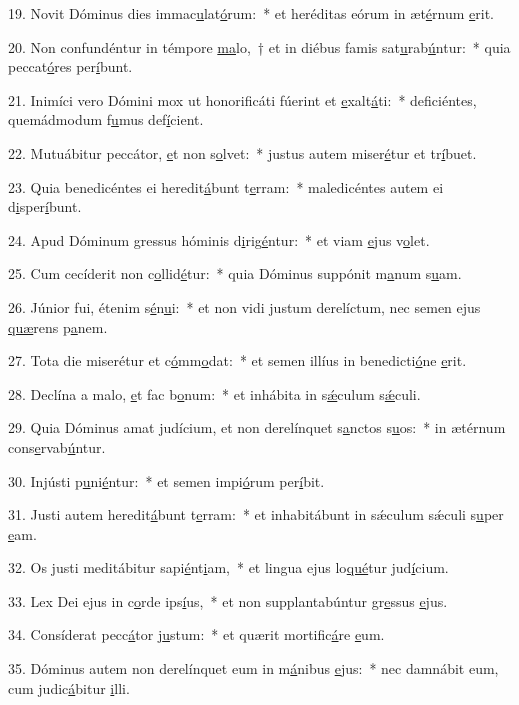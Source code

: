 19. Novit Dóminus dies immac\uline{u}lat\uline{ó}rum:~* et heréditas eórum in æt\uline{é}rnum \uline{e}rit.\par 
20. Non confundéntur in témpore \uline{ma}lo,~† et in diébus famis sat\uline{u}rab\uline{ú}ntur:~* quia peccat\uline{ó}res per\uline{í}bunt.\par 
21. Inimíci vero Dómini mox ut honorificáti fúerint et \uline{e}xalt\uline{á}ti:~* deficiéntes, quemádmodum f\uline{u}mus def\uline{í}cient.\par 
22. Mutuábitur peccátor, \uline{e}t non s\uline{o}lvet:~* justus autem miser\uline{é}tur et tr\uline{í}buet.\par 
23. Quia benedicéntes ei heredit\uline{á}bunt t\uline{e}rram:~* maledicéntes autem ei d\uline{i}sper\uline{í}bunt.\par 
24. Apud Dóminum gressus hóminis d\uline{i}rig\uline{é}ntur:~* et viam \uline{e}jus v\uline{o}let.\par 
25. Cum cecíderit non c\uline{o}llid\uline{é}tur:~* quia Dóminus suppónit m\uline{a}num s\uline{u}am.\par 
26. Júnior fui, étenim s\uline{é}n\uline{u}i:~* et non vidi justum derelíctum, nec semen ejus \uline{quæ}rens p\uline{a}nem.\par 
27. Tota die miserétur et c\uline{ó}mm\uline{o}dat:~* et semen illíus in benedicti\uline{ó}ne \uline{e}rit.\par 
28. Declína a malo, \uline{e}t fac b\uline{o}num:~* et inhábita in s\uline{ǽ}culum s\uline{ǽ}culi.\par 
29. Quia Dóminus amat judícium, et non derelínquet s\uline{a}nctos s\uline{u}os:~* in ætérnum cons\uline{e}rvab\uline{ú}ntur.\par 
30. Injústi p\uline{u}ni\uline{é}ntur:~* et semen impi\uline{ó}rum per\uline{í}bit.\par 
31. Justi autem heredit\uline{á}bunt t\uline{e}rram:~* et inhabitábunt in sǽculum sǽculi s\uline{u}per \uline{e}am.\par 
32. Os justi meditábitur sapi\uline{é}nt\uline{i}am,~* et lingua ejus lo\uline{qué}tur jud\uline{í}cium.\par 
33. Lex Dei ejus in c\uline{o}rde ips\uline{í}us,~* et non supplantabúntur gr\uline{e}ssus \uline{e}jus.\par 
34. Consíderat pecc\uline{á}tor j\uline{u}stum:~* et quærit mortific\uline{á}re \uline{e}um.\par 
35. Dóminus autem non derelínquet eum in m\uline{á}nibus \uline{e}jus:~* nec damnábit eum, cum judic\uline{á}bitur \uline{i}lli.\par 
